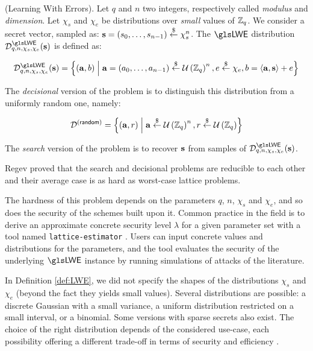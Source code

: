 \begin{definition}
	(Learning With Errors). Let $q$ and $n$ two integers, respectively called \textit{modulus} and \textit{dimension}.  Let $\chi_s$ and $\chi_e$ be distributions over \textit{small} values of $\mathbb{Z}_q$. We consider a secret vector, sampled as: $\mathbf s = (s_0, \dots, s_{n-1}) \overset{\$}{\leftarrow} \chi_s^n$. The $\LWE$ distribution $\mathcal{D}_{q, n, \chi_s, \chi_e}^{\LWE}(\lweSecretKey)$ is defined as:
	
	 \[
	 \mathcal{D}_{q, n, \chi_s, \chi_e}^{\LWE}(\lweSecretKey) = \left \{(\vec a, b) \;\middle|\; \vec a = (a_0, \dots, a_{n-1}) \drawfrom \unif{\lweRing}^n, e \drawfrom \chi_e, b = \innerProduct{\vec a}{\vec s} + e \right \}
	  \]
	 
	 The \textit{decisional} version of the problem is to distinguish this distribution from a uniformly random one, namely:
	
	\[
	\mathcal{D}^{(\textsf{random})} = \left \{(\mathbf a, r) \;\middle|\; \mathbf a \overset{\$}{\leftarrow} \mathcal U \left ( \mathbb{Z}_q \right )^n, r \overset{\$}{\leftarrow} \mathcal U \left ( \mathbb{Z}_q \right ) \right\}
	\]

	The \emph{search} version of the problem is to recover $\mathbf s$ from samples of $\mathcal{D}_{q, n, \chi_s, \chi_e}^{\LWE}(\lweSecretKey)$. 
	\label{def:LWE}
\end{definition}


Regev proved that the search and decisional problems are reducible to each other and their average case is as hard as worst-case lattice problems.

The hardness of this problem depends on the parameters $q$, $n$, $\chi_s$ and $\chi_e$, and so does the security of the schemes built upon it. Common practice in the field is to derive an approximate concrete security level $\lambda$ for a given parameter set with a tool named \texttt{lattice-estimator} \cite{lattice-estimator}. Users can input concrete values and distributions for the parameters, and the tool evaluates the security of the underlying $\LWE$ instance by running simulations of attacks of the literature. 

In Definition \ref{def:LWE}, we did not specify the shapes of the distributions $\chi_s$ and $\chi_e$ (beyond the fact they yields small values). Several distributions are possible: a discrete Gaussian with a small variance, a uniform distribution restricted on a small interval, or a binomial. Some versions with sparse secrets also exist. The choice of the right distribution depends of the considered use-case, each possibility offering a different trade-off in terms of security and efficiency \cite{AFRICACRYPT:BGPW16, DBLP:conf/ccs/CurtisP19, EPRINT:BGPT19, EPRINT:SLZS24}.


